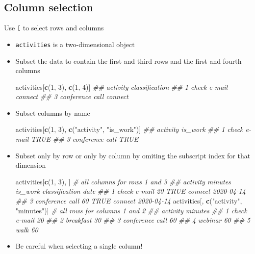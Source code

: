 \documentclass[
]{book}
\newenvironment{Shaded}{\begin{snugshade}}{\end{snugshade}}
\newcommand{\CommentTok}[1]{\textcolor[rgb]{0.56,0.35,0.01}{\textit{#1}}}
\newcommand{\DecValTok}[1]{\textcolor[rgb]{0.00,0.00,0.81}{#1}}
\newcommand{\KeywordTok}[1]{\textcolor[rgb]{0.13,0.29,0.53}{\textbf{#1}}}
\newcommand{\NormalTok}[1]{#1}
\newcommand{\StringTok}[1]{\textcolor[rgb]{0.31,0.60,0.02}{#1}}
\begin{document}
\hypertarget{column-selection}{%
\subsection*{Column selection}\label{column-selection}}

Use \texttt{{[}} to select rows and columns

\begin{itemize}
\item
  \texttt{activities} is a two-dimensional object
\item
  Subset the data to contain the first and third rows and the first and fourth columns

\begin{Shaded}
\begin{Highlighting}[]
\NormalTok{activities[}\KeywordTok{c}\NormalTok{(}\DecValTok{1}\NormalTok{, }\DecValTok{3}\NormalTok{), }\KeywordTok{c}\NormalTok{(}\DecValTok{1}\NormalTok{, }\DecValTok{4}\NormalTok{)]}
\CommentTok{##          activity classification}
\CommentTok{## 1    check e-mail        connect}
\CommentTok{## 3 conference call        connect}
\end{Highlighting}
\end{Shaded}
\item
  Subset columns by name

\begin{Shaded}
\begin{Highlighting}[]
\NormalTok{activities[}\KeywordTok{c}\NormalTok{(}\DecValTok{1}\NormalTok{, }\DecValTok{3}\NormalTok{), }\KeywordTok{c}\NormalTok{(}\StringTok{"activity"}\NormalTok{, }\StringTok{"is_work"}\NormalTok{)]}
\CommentTok{##          activity is_work}
\CommentTok{## 1    check e-mail    TRUE}
\CommentTok{## 3 conference call    TRUE}
\end{Highlighting}
\end{Shaded}
\item
  Subset only by row or only by column by omiting the subscript index for that dimension

\begin{Shaded}
\begin{Highlighting}[]
\NormalTok{activities[}\KeywordTok{c}\NormalTok{(}\DecValTok{1}\NormalTok{, }\DecValTok{3}\NormalTok{), ]                  }\CommentTok{# all columns for rows 1 and 3}
\CommentTok{##          activity minutes is_work classification       date}
\CommentTok{## 1    check e-mail      20    TRUE        connect 2020-04-14}
\CommentTok{## 3 conference call      60    TRUE        connect 2020-04-14}
\NormalTok{activities[, }\KeywordTok{c}\NormalTok{(}\StringTok{"activity"}\NormalTok{, }\StringTok{"minutes"}\NormalTok{)] }\CommentTok{# all rows for columns 1 and 2}
\CommentTok{##          activity minutes}
\CommentTok{## 1    check e-mail      20}
\CommentTok{## 2       breakfast      30}
\CommentTok{## 3 conference call      60}
\CommentTok{## 4         webinar      60}
\CommentTok{## 5            walk      60}
\end{Highlighting}
\end{Shaded}
\item
  Be careful when selecting a single column!


\end{itemize}
\end{document}
